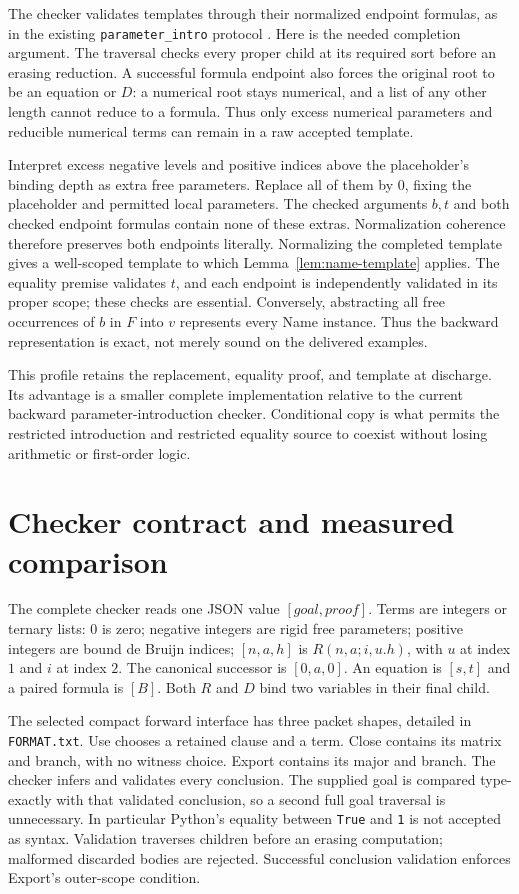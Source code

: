 \documentclass[11pt,letterpaper]{article}
\theoremstyle{definition}\newtheorem{definition}[theorem]{Definition}
\theoremstyle{remark}\newtheorem{remark}[theorem]{Remark}
\newcommand{\file}[1]{{\small\nolinkurl{#1}}}
\begin{document}
The checker validates templates through their normalized endpoint
formulas, as in the existing \file{parameter_intro} protocol
\cite{parameter}. Here is the needed completion argument. The traversal
checks every proper child at its required sort before an erasing
reduction. A successful formula endpoint also forces the original root
to be an equation or $D$: a numerical root stays numerical, and a list
of any other length cannot reduce to a formula. Thus only excess
numerical parameters and reducible numerical terms can remain in a raw
accepted template.

Interpret excess negative levels and positive indices above the
placeholder's binding depth as extra free parameters. Replace all of
them by $0$, fixing the placeholder and permitted local parameters.
The checked arguments $b,t$ and both checked endpoint formulas contain
none of these extras. Normalization coherence therefore preserves both
endpoints literally. Normalizing the completed template gives a
well-scoped template to which Lemma~\ref{lem:name-template} applies.
The equality premise validates $t$, and each endpoint is independently
validated in its proper scope; these checks are essential. Conversely, abstracting
all free occurrences of $b$ in $F$ into $v$ represents every Name
instance. Thus the backward representation is exact, not merely sound
on the delivered examples.

This profile retains the replacement, equality proof, and template at
discharge. Its advantage is a smaller complete implementation relative
to the current backward parameter-introduction checker. Conditional
copy is what permits the restricted introduction and restricted equality
source to coexist without losing arithmetic or first-order logic.

\section{Checker contract and measured comparison}\label{sec:implementation}
The complete checker reads one JSON value $[\textit{goal},\textit{proof}]$.
Terms are integers or ternary lists: $0$ is zero; negative integers
are rigid free parameters; positive integers are bound de Bruijn
indices; $[n,a,h]$ is $R(n,a;i,u.h)$, with $u$ at index $1$ and $i$
at index $2$. The canonical successor is $[0,a,0]$. An equation is
$[s,t]$ and a paired formula is $[B]$. Both $R$ and $D$ bind two
variables in their final child.

The selected compact forward interface has three packet shapes, detailed
in \file{FORMAT.txt}. Use chooses a retained clause and a term. Close
contains its matrix and branch, with no witness choice. Export contains
its major and branch. The checker infers and validates every conclusion.
The supplied goal is compared type-exactly with that validated conclusion,
so a second full goal traversal is unnecessary. In particular Python's
equality between \texttt{True} and \texttt{1} is not accepted as syntax.
Validation traverses children before an erasing computation; malformed
discarded bodies are rejected. Successful conclusion validation enforces
Export's outer-scope condition.
\end{document}
